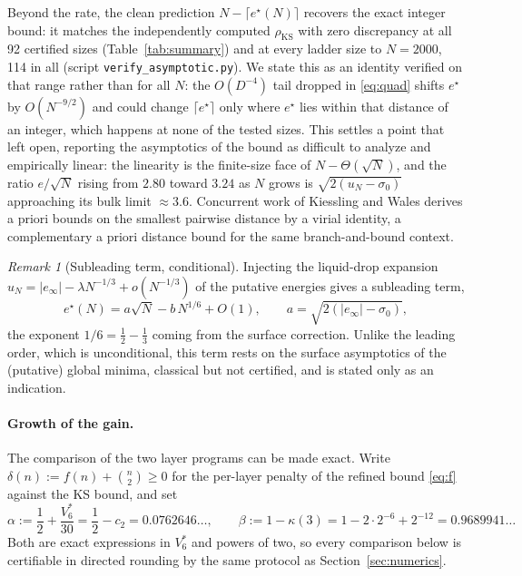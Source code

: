 \documentclass[11pt]{article}
\theoremstyle{remark}
\newtheorem{remark}{Remark}
\newcommand{\KS}{\mathrm{KS}}
\begin{document}
Beyond the rate, the clean prediction $N-\lceil e^\star(N)\rceil$ recovers the exact integer bound: it matches the independently computed $\rho_\KS$ with zero discrepancy at all 92 certified sizes (Table~\ref{tab:summary}) and at every ladder size to $N=2000$, 114 in all (script \texttt{verify\_asymptotic.py}). We state this as an identity verified on that range rather than for all $N$: the $O(D^{-4})$ tail dropped in \eqref{eq:quad} shifts $e^\star$ by $O(N^{-9/2})$ and could change $\lceil e^\star\rceil$ only where $e^\star$ lies within that distance of an integer, which happens at none of the tested sizes. This settles a point that \cite{ks2025} left open, reporting the asymptotics of the bound as difficult to analyze and empirically linear: the linearity is the finite-size face of $N-\Theta(\sqrt N)$, and the ratio $e/\sqrt N$ rising from $2.80$ toward $3.24$ as $N$ grows is $\sqrt{2(u_N-\sigma_0)}$ approaching its bulk limit $\approx3.6$. Concurrent work of Kiessling and Wales \cite{kiessling2025} derives a priori bounds on the smallest pairwise distance by a virial identity, a complementary a priori distance bound for the same branch-and-bound context.

\begin{remark}[Subleading term, conditional]\label{rem:subleading}
Injecting the liquid-drop expansion $u_N=|e_\infty|-\lambda N^{-1/3}+o(N^{-1/3})$ of the putative energies gives a subleading term,
\[
e^\star(N) = a\sqrt N - b\,N^{1/6} + O(1), \qquad a=\sqrt{2(|e_\infty|-\sigma_0)},
\]
the exponent $1/6=\tfrac12-\tfrac13$ coming from the surface correction. Unlike the leading order, which is unconditional, this term rests on the surface asymptotics of the (putative) global minima, classical but not certified, and is stated only as an indication.
\end{remark}

\paragraph{Growth of the gain.}
The comparison of the two layer programs can be made exact. Write $\delta(n):=f(n)+\binom n2\ge0$ for the per-layer penalty of the refined bound \eqref{eq:f} against the KS bound, and set
\[
\alpha := \frac12+\frac{V^*_6}{30} = \frac12-c_2 = 0.0762646\ldots,
\qquad
\beta := 1-\kappa(3) = 1-2\cdot2^{-6}+2^{-12} = 0.9689941\ldots
\]
Both are exact expressions in $V^*_6$ and powers of two, so every comparison below is certifiable in directed rounding by the same protocol as Section~\ref{sec:numerics}.
\end{document}

